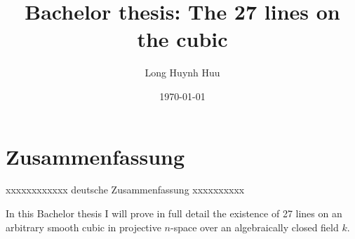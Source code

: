\documentclass[12pt,a4paper,twoside]{scrartcl}
\title{Bachelor thesis: The 27 lines on the cubic}
\author{Long Huynh Huu}
\date{\today}
\begin{document}


\section*{Zusammenfassung}
xxxxxxxxxxxx deutsche Zusammenfassung xxxxxxxxxx

In this Bachelor thesis I will prove in full detail the existence of 27 lines on an arbitrary smooth cubic in projective $n$-space over an algebraically closed field $k$.

\newpage
\tableofcontents
\newpage

\pagestyle{headings}


% 

\end{document}

